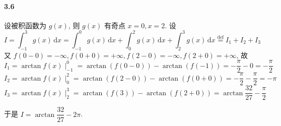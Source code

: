 \paragraph*{3.6}  设被积函数为 $g(x)$, 则 $g(x)$ 有奇点 $x=0,x=2$. 设
\[
	I=\int_{-1}^3g(x)\,\mathrm dx=\int_{-1}^0g(x)\,\mathrm dx+\int_{0}^{2}g(x)\,\mathrm dx+\int_{2}^{3}g(x)\,\mathrm dx\overset{\mathrm{def}}{=}I_1+I_2+I_3
\] 
又 $f(0-0)=-\infty,f(0+0)=+\infty,f(2-0)=-\infty,f(2+0)=+\infty$, 故
\[
	I_1=\arctan f(x)\mid_{-1}^{0}=\arctan(f(0-0))-\arctan (f(-1))=-\dfrac{\pi}{2}-0=-\dfrac{\pi}{2}
\]
\[
	I_2=\arctan f(x)\mid_{0}^{2}=\arctan(f(2-0))-\arctan (f(0+0))=-\dfrac{\pi}{2}-\dfrac{\pi}{2}=-\pi
\]
\[
	I_3=\arctan f(x)\mid_{2}^{3}=\arctan(f(3))-\arctan(f(2+0))=\arctan\dfrac{32}{27}-\dfrac{\pi}{2}
\]

于是 $I=\arctan\dfrac{32}{27}-2\pi$.